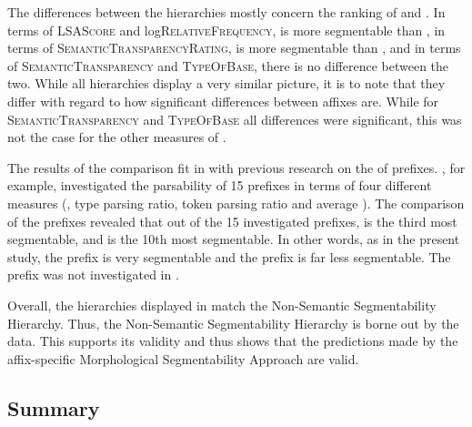 The differences  between the hierarchies mostly concern the ranking of  and . In terms of \textsc{LSAScore} and log\textsc{RelativeFrequency},  is more segmentable than , in terms of \textsc{SemanticTransparencyRating},  is more segmentable than , and in terms of \textsc{SemanticTransparency} and \textsc{TypeOfBase}, there is no difference between the two. 
While all hierarchies display a very similar picture, it is to note that they differ with regard to how significant differences between affixes are. While for \textsc{SemanticTransparency} and \textsc{TypeOfBase} all differences were significant, this was not the case for the other measures of . 


The results of the  comparison fit in with previous research on the  of prefixes. \cite{Zirkel.2010}, for example, investigated the parsability of 15 prefixes in terms of four different measures (, type parsing ratio, token parsing ratio and average ). The comparison of the prefixes revealed that out of the 15 investigated prefixes,  is the third most segmentable, and  is the 10th most segmentable. In other words, as in the present study, the prefix  is very segmentable and the prefix  is far less segmentable. The prefix  was not investigated in \cite{Zirkel.2010}. 

Overall, the  hierarchies displayed in  match the Non-Semantic Segmentability Hierarchy. Thus, the Non-Semantic Segmentability Hierarchy is borne out by the data. This supports its validity and thus shows that the predictions made by the affix-specific Morphological Segmentability Approach are valid.

\subsection{Summary } \label{summary decomposability corpus study}

